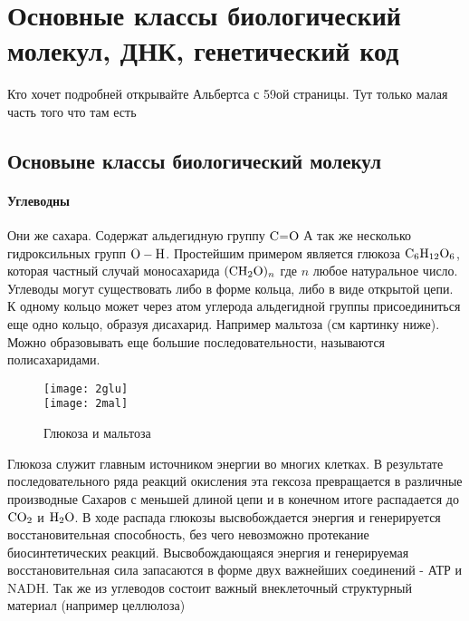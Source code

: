 \section{Основные классы биологический молекул, ДНК, генетический код}
Кто хочет подробней открывайте Альбертса с 59ой страницы. Тут только малая часть того что там есть
\subsection{Основыне классы биологический молекул}
\paragraph{Углеводны} Они же сахара. Содержат альдегидную группу $\ce{C=O}$ А так же несколько гидроксильных групп $\ce{O - H}$. Простейшим примером является глюкоза $\ce{C6H12O6}$, которая частный случай моносахарида $\ce{(CH2O)_n}$ где $n$ любое натуральное число. Углеводы могут существовать либо в форме кольца, либо
в виде открытой цепи. К одному кольцо может через атом углерода альдегидной группы присоединиться еще одно кольцо, образуя дисахарид. Например мальтоза (см картинку ниже). Можно образовывать еще большие последовательности, называются полисахаридами.
\begin{figure}[H]
	\texttt{[image: 2glu]}\\
	\texttt{[image: 2mal]}
	\caption{Глюкоза и мальтоза}
\end{figure}
Глюкоза служит главным источником энергии во многих клетках. В результате последовательного ряда реакций окисления эта гексоза превращается в различные производные Сахаров с меньшей длиной цепи и в конечном итоге распадается до $\ce{CO2}$ и $\ce{H2O}$. В ходе распада глюкозы высвобождается энергия и генерируется восстановительная способность, без чего невозможно протекание
биосинтетических реакций. Высвобождающаяся энергия и генерируемая восстановительная сила запасаются в форме двух важнейших соединений -
АТР и NADH. Так же из углеводов состоит важный внеклеточный структурный материал (например целлюлоза) 
